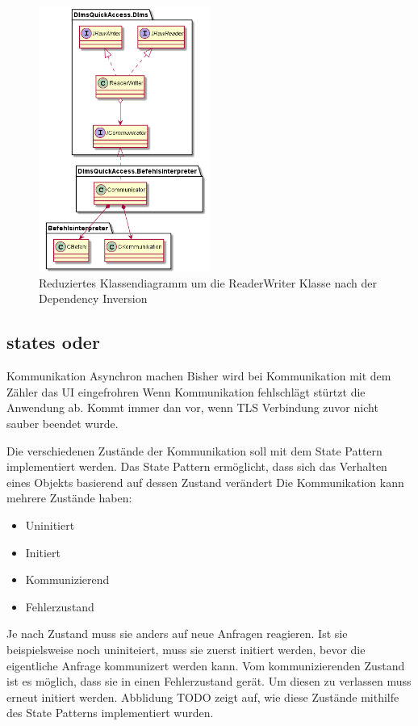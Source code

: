 


\begin{figure}[H]
   \centering
   \includegraphics[width=0.5\textwidth]{gfx/dlms_nachher.png}
   \caption{
      Reduziertes Klassendiagramm um die ReaderWriter Klasse nach der Dependency Inversion
   }
   \label{fig:dlms_nachher}
\end{figure}

\subsection{states oder}

Kommunikation Asynchron machen
Bisher wird bei Kommunikation mit dem Zähler das UI eingefrohren
Wenn Kommunikation fehlschlägt stürtzt die Anwendung ab.
Kommt immer dan vor, wenn TLS Verbindung zuvor nicht sauber beendet wurde.

Die verschiedenen Zustände der Kommunikation soll mit dem State Pattern implementiert werden.
Das State Pattern ermöglicht, dass sich das Verhalten eines Objekts basierend auf dessen Zustand verändert \parencite{designPatterns}
Die Kommunikation kann mehrere Zustände haben:
\begin{itemize}
   \item Uninitiert
   \item Initiert
   \item Kommunizierend
   \item Fehlerzustand
\end{itemize}
Je nach Zustand muss sie anders auf neue Anfragen reagieren.
Ist sie beispielsweise noch uniniteiert, muss sie zuerst initiert werden, bevor die eigentliche Anfrage kommunizert werden kann.
Vom kommunizierenden Zustand ist es möglich, dass sie in einen Fehlerzustand gerät.
Um diesen zu verlassen muss erneut initiert werden.
Abblidung TODO zeigt auf, wie diese Zustände mithilfe des State Patterns implementiert wurden.

